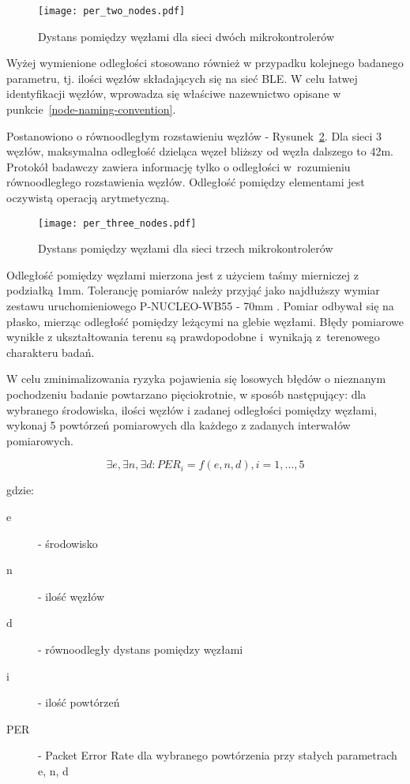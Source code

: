\begin{figure}[!ht]
	\centering \texttt{[image: per\_two\_nodes.pdf]} 
	\caption{Dystans pomiędzy węzłami dla sieci dwóch mikrokontrolerów}
	\label{rys:two_nodes_setup}
\end{figure}

Wyżej wymienione odległości stosowano również w przypadku kolejnego badanego parametru, tj. ilości węzłów
składających się na sieć BLE. W celu łatwej identyfikacji węzłów, wprowadza się właściwe nazewnictwo
opisane w punkcie~\ref{node-naming-convention}.

Postanowiono o równoodległym rozstawieniu węzłów - Rysunek~\ref{rys:three_nodes_setup}. Dla sieci 3 węzłów,
maksymalna odległość dzieląca węzeł bliższy od węzła dalszego to 42m. Protokół badawczy zawiera informację 
tylko o odległości w~rozumieniu równoodległego rozstawienia węzłów. Odległość pomiędzy elementami 
jest oczywistą operacją arytmetyczną.

\begin{figure}[!ht]
	\centering \texttt{[image: per\_three\_nodes.pdf]} 
	\caption{Dystans pomiędzy węzłami dla sieci trzech mikrokontrolerów}
	\label{rys:three_nodes_setup}
\end{figure}

Odległość pomiędzy węzłami mierzona jest z użyciem taśmy mierniczej z podziałką 1mm. Tolerancję pomiarów należy
przyjąć jako najdłuższy wymiar zestawu uruchomieniowego P-NUCLEO-WB55 - 70mm \cite{stmicroelectronics_um2435_2019}.
Pomiar odbywał się na płasko, mierząc odległość pomiędzy leżącymi na glebie węzłami. Błędy pomiarowe wynikłe
z ukształtowania terenu są prawdopodobne i~wynikają z~terenowego charakteru badań.

W celu zminimalizowania ryzyka pojawienia się losowych błędów o nieznanym pochodzeniu badanie powtarzano pięciokrotnie,
w sposób następujący: dla wybranego środowiska, ilości węzłów i zadanej odległości pomiędzy węzłami, wykonaj
5 powtórzeń pomiarowych dla każdego z zadanych interwałów pomiarowych.

\begin{equation}
\label{experiment_definition}
\exists e, \exists n, \exists d: PER_i = f(e, n, d), i=1,...,5
\end{equation}

gdzie:

\begin{description}
\item[e] - środowisko
\item[n] - ilość węzłów
\item[d] - równoodległy dystans pomiędzy węzłami
\item[i] - ilość powtórzeń
\item[PER] - Packet Error Rate dla wybranego powtórzenia przy stałych parametrach e, n, d
\end{description}

